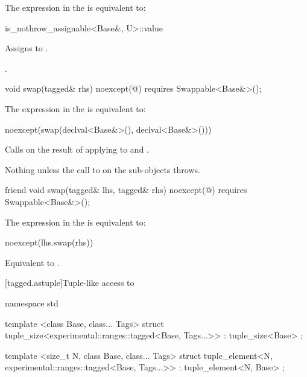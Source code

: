 \begin{itemdescr}
\pnum
\remarks The expression in the  is equivalent to:

\begin{codeblock}
is_nothrow_assignable<Base&, U>::value
\end{codeblock}

\pnum
\effects Assigns  to .

\pnum
\returns {}.
\end{itemdescr}

\begin{itemdecl}
void swap(tagged& rhs) noexcept(@\seebelow@)
  requires Swappable<Base&>();
\end{itemdecl}

\begin{itemdescr}
\pnum
\remarks The expression in the  is equivalent to:

\begin{codeblock}
noexcept(swap(declval<Base&>(), declval<Base&>()))
\end{codeblock}

\pnum
\effects Calls  on the result of applying  to  and
.

\pnum
\throws Nothing unless the call to  on the  sub-objects throws.
\end{itemdescr}

%
\begin{itemdecl}
friend void swap(tagged& lhs, tagged& rhs) noexcept(@\seebelow@)
  requires Swappable<Base&>();
\end{itemdecl}

\begin{itemdescr}
\pnum
\remarks The expression in the  is equivalent to:

\begin{codeblock}
noexcept(lhs.swap(rhs))
\end{codeblock}

\pnum
\effects Equivalent to .
\end{itemdescr}

[tagged.astuple]{Tuple-like access to }

%
%
\begin{itemdecl}
namespace std {
  template <class Base, class... Tags>
  struct tuple_size<experimental::ranges::tagged<Base, Tags...>>
    : tuple_size<Base> { };

  template <size_t N, class Base, class... Tags>
  struct tuple_element<N, experimental::ranges::tagged<Base, Tags...>>
    : tuple_element<N, Base> { };
}
\end{itemdecl}

